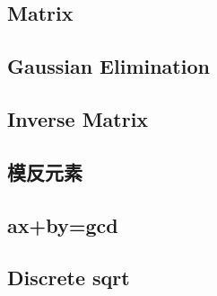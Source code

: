 \documentclass[a4paper,10pt,twocolumn,oneside]{article}
\begin{document}
%

\subsection{Matrix}


\subsection{Gaussian Elimination}


\subsection{Inverse Matrix}



\subsection{模反元素}


\subsection{ax+by=gcd}


\subsection{Discrete sqrt}


% 

%

%
\end{document}
